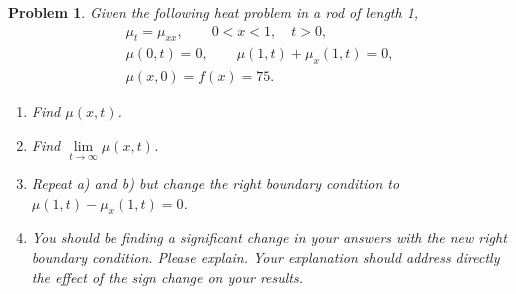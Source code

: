\documentclass[letterpaper,11pt]{article} %
\theoremstyle{plain}
\newtheorem{problem}{Problem}
\begin{document}
\begin{problem}
    Given the following heat problem in a rod of length 1,
    \begin{gather*}
        \mu_t = \mu_{xx}, \qquad 0 < x< 1, \quad t > 0, \\
        \mu(0, t) = 0, \qquad \mu(1, t) + \mu_x(1,t) = 0,\\
        \mu(x, 0) = f(x) = 75.
    \end{gather*}
    \begin{enumerate}[label=\alph*.)]
        \item Find $\mu(x,t)$.
        \item Find $\lim\limits_{t \to \infty} \mu(x, t)$.
        \item Repeat a) and b) but change the right boundary condition to $\mu(1,t) -\mu_x(1,t) = 0$.
        \item You should be finding a significant change in your answers with the new right boundary condition. Please explain. Your explanation should address directly the effect of the sign change on your results.
    \end{enumerate}
\end{problem}
\end{document}
